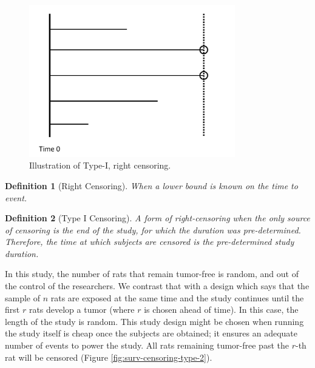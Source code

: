 \documentclass[
]{book}
\theoremstyle{plain}
\theoremstyle{mydefn}
\newtheorem{definition}{Definition}[chapter]
\theoremstyle{myexmpl}
\theoremstyle{remark}
\begin{document}
\begin{figure}

{\centering \includegraphics[width=0.8\textwidth]{images/censoring-type-1} 

}

\caption{Illustration of Type-I, right censoring.}\label{fig:surv-censoring-type-1}
\end{figure}

\begin{definition}[Right Censoring]
\protect\hypertarget{def:defn-right-censoring}{}{\label{def:defn-right-censoring} {} }When a \emph{lower} bound is known on the time to event.
\end{definition}

\begin{definition}[Type I Censoring]
\protect\hypertarget{def:defn-type-I}{}{\label{def:defn-type-I} {} }A form of right-censoring when the only source of censoring is the end of the study, for which the duration was pre-determined. Therefore, the time at which subjects are censored is the pre-determined study duration.
\end{definition}

In this study, the number of rats that remain tumor-free is random, and out of the control of the researchers. We contrast that with a design which says that the sample of \(n\) rats are exposed at the same time and the study continues until the first \(r\) rats develop a tumor (where \(r\) is chosen ahead of time). In this case, the length of the study is random. This study design might be chosen when running the study itself is cheap once the subjects are obtained; it ensures an adequate number of events to power the study. All rats remaining tumor-free past the \(r\)-th rat will be censored (Figure \ref{fig:surv-censoring-type-2}).
\end{document}
